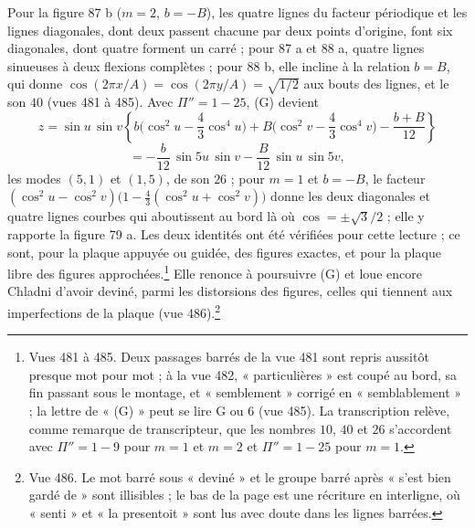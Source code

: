 \documentclass[11pt,a4paper]{article}
\begin{document}
Pour la figure 87 b ($m = 2$, $b = -B$), les quatre lignes du facteur périodique et
les lignes diagonales, dont deux passent chacune par deux points d'origine, font six
diagonales, dont quatre forment un carré ; pour 87 a et 88 a, quatre lignes sinueuses
à deux flexions complètes ; pour 88 b, elle incline à la relation $b = B$, qui donne
$\cos(2\pi x/A) = \cos(2\pi y/A) = \sqrt{1/2}$ aux bouts des lignes, et le son $40$
(vues 481 à 485). Avec $\Pi'' = 1 - 25$, (G) devient
\[
z = \sin u\,\sin v\left\{b\Big(\cos^2 u - \frac{4}{3}\cos^4 u\Big) + B\Big(\cos^2 v - \frac43\cos^4 v\Big) - \frac{b+B}{12}\right\}
\]
\[
= -\frac{b}{12}\,\sin 5u\,\sin v - \frac{B}{12}\,\sin u\,\sin 5v ,
\]
les modes $(5,1)$ et $(1,5)$, de son $26$ ; pour $m = 1$ et $b = -B$, le facteur
$(\cos^2 u - \cos^2 v)\big(1 - \frac43(\cos^2 u + \cos^2 v)\big)$ donne les deux
diagonales et quatre lignes courbes qui aboutissent au bord là où
$\cos = \pm\sqrt3/2$ ; elle y rapporte la figure 79 a. Les deux identités ont été
vérifiées pour cette lecture ; ce sont, pour la plaque appuyée ou guidée, des figures
exactes, et pour la plaque libre des figures approchées.\footnote{Vues 481 à 485.
Deux passages barrés de la vue 481 sont repris aussitôt presque mot pour mot ; à la
vue 482, « particulières » est coupé au bord, sa fin passant sous le montage, et « semblement » corrigé en
« semblablement » ; la lettre de « (G) » peut se lire G ou 6 (vue 485). La
transcription relève, comme remarque de transcripteur, que les nombres $10$, $40$ et
$26$ s'accordent avec $\Pi'' = 1 - 9$ pour $m = 1$ et $m = 2$ et $\Pi'' = 1 - 25$ pour
$m = 1$.} Elle renonce à poursuivre (G) et loue encore Chladni d'avoir deviné, parmi
les distorsions des figures, celles qui tiennent aux imperfections de la plaque (vue
486).\footnote{Vue 486. Le mot barré sous « deviné » et le groupe barré après « s'est
bien gardé de » sont illisibles ; le bas de la page est une récriture en interligne,
où « senti » et « la presentoit » sont lus avec doute dans les lignes barrées.}
\end{document}
